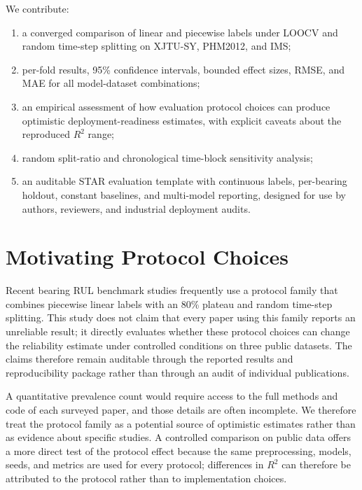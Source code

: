 \documentclass[pdflatex,sn-mathphys-num]{sn-jnl}
\begin{document}
We contribute:
\begin{enumerate}
    \item a converged comparison of linear and piecewise labels under LOOCV and random time-step splitting on XJTU-SY, PHM2012, and IMS;
    \item per-fold results, 95\% confidence intervals, bounded effect sizes, RMSE, and MAE for all model-dataset combinations;
    \item an empirical assessment of how evaluation protocol choices can produce optimistic deployment-readiness estimates, with explicit caveats about the reproduced $R^2$ range;
    \item random split-ratio and chronological time-block sensitivity analysis;
    \item an auditable STAR evaluation template with continuous labels, per-bearing holdout, constant baselines, and multi-model reporting, designed for use by authors, reviewers, and industrial deployment audits.
\end{enumerate}

\section{Motivating Protocol Choices}
Recent bearing RUL benchmark studies frequently use a protocol family that combines piecewise linear labels with an 80\% plateau and random time-step splitting. This study does not claim that every paper using this family reports an unreliable result; it directly evaluates whether these protocol choices can change the reliability estimate under controlled conditions on three public datasets. The claims therefore remain auditable through the reported results and reproducibility package rather than through an audit of individual publications.

A quantitative prevalence count would require access to the full methods and code of each surveyed paper, and those details are often incomplete. We therefore treat the protocol family as a potential source of optimistic estimates rather than as evidence about specific studies. A controlled comparison on public data offers a more direct test of the protocol effect because the same preprocessing, models, seeds, and metrics are used for every protocol; differences in $R^2$ can therefore be attributed to the protocol rather than to implementation choices.
\end{document}
